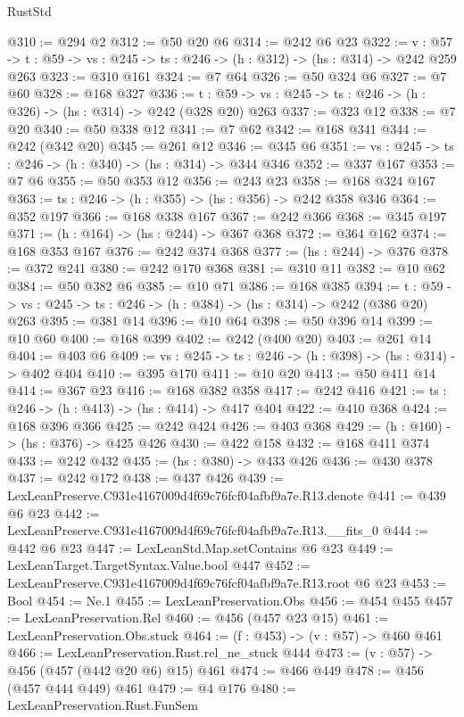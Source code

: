 \begin{lexlean}{RustStd}
\begin{coremodule}
@310 := @294 @2
@312 := @50 @20 @6
@314 := @242 @6 @23
@322 := {v : @57} ->
  {t : @59} -> {vs : @245} -> {ts : @246} -> (h : @312) -> (hs : @314) -> @242 @259 @263
@323 := @310 @161
@324 := @7 @64
@326 := @50 @324 @6
@327 := @7 @60
@328 := @168 @327
@336 := {t : @59} -> {vs : @245} -> {ts : @246} -> (h : @326) -> (hs : @314) -> @242 (@328 @20) @263
@337 := @323 @12
@338 := @7 @20
@340 := @50 @338 @12
@341 := @7 @62
@342 := @168 @341
@344 := @242 (@342 @20)
@345 := @261 @12
@346 := @345 @6
@351 := {vs : @245} -> {ts : @246} -> (h : @340) -> (hs : @314) -> @344 @346
@352 := @337 @167
@353 := @7 @6
@355 := @50 @353 @12
@356 := @243 @23
@358 := @168 @324 @167
@363 := {ts : @246} -> (h : @355) -> (hs : @356) -> @242 @358 @346
@364 := @352 @197
@366 := @168 @338 @167
@367 := @242 @366
@368 := @345 @197
@371 := (h : @164) -> (hs : @244) -> @367 @368
@372 := @364 @162
@374 := @168 @353 @167
@376 := @242 @374 @368
@377 := (hs : @244) -> @376
@378 := @372 @241
@380 := @242 @170 @368
@381 := @310 @11
@382 := @10 @62
@384 := @50 @382 @6
@385 := @10 @71
@386 := @168 @385
@394 := {t : @59} -> {vs : @245} -> {ts : @246} -> (h : @384) -> (hs : @314) -> @242 (@386 @20) @263
@395 := @381 @14
@396 := @10 @64
@398 := @50 @396 @14
@399 := @10 @60
@400 := @168 @399
@402 := @242 (@400 @20)
@403 := @261 @14
@404 := @403 @6
@409 := {vs : @245} -> {ts : @246} -> (h : @398) -> (hs : @314) -> @402 @404
@410 := @395 @170
@411 := @10 @20
@413 := @50 @411 @14
@414 := @367 @23
@416 := @168 @382 @358
@417 := @242 @416
@421 := {ts : @246} -> (h : @413) -> (hs : @414) -> @417 @404
@422 := @410 @368
@424 := @168 @396 @366
@425 := @242 @424
@426 := @403 @368
@429 := (h : @160) -> (hs : @376) -> @425 @426
@430 := @422 @158
@432 := @168 @411 @374
@433 := @242 @432
@435 := (hs : @380) -> @433 @426
@436 := @430 @378
@437 := @242 @172
@438 := @437 @426
@439 := LexLeanPreserve.C931e4167009d4f69c76fcf04afbf9a7e.R13.denote
@441 := @439 @6 @23
@442 := LexLeanPreserve.C931e4167009d4f69c76fcf04afbf9a7e.R13.__fits_0
@444 := @442 @6 @23
@447 := LexLeanStd.Map.setContains @6 @23
@449 := LexLeanTarget.TargetSyntax.Value.bool @447
@452 := LexLeanPreserve.C931e4167009d4f69c76fcf04afbf9a7e.R13.root @6 @23
@453 := Bool
@454 := Ne.{1}
@455 := LexLeanPreservation.Obs
@456 := @454 @455
@457 := LexLeanPreservation.Rel
@460 := @456 (@457 @23 @15)
@461 := LexLeanPreservation.Obs.stuck
@464 := (f : @453) -> (v : @57) -> @460 @461
@466 := LexLeanPreservation.Rust.rel_ne_stuck @444
@473 := (v : @57) -> @456 (@457 (@442 @20 @6) @15) @461
@474 := @466 @449
@478 := @456 (@457 @444 @449) @461
@479 := @4 @176
@480 := LexLeanPreservation.Rust.FunSem

\end{coremodule}
\end{lexlean}
